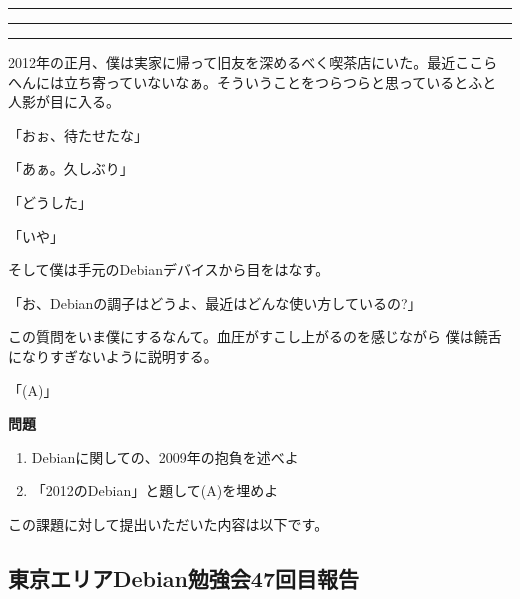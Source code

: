 \documentclass[mingoth,a4paper]{jsarticle}
\begin{document}
\newpage

\begin{minipage}[b]{0.2\hsize}
 \colorbox{titleback}{}
\end{minipage}
\begin{minipage}[b]{0.8\hsize}
\hrule
\vspace{2mm}
\hrule
%
%
\setcounter{tocdepth}{1}
\tableofcontents
\vspace{2mm}
\hrule
\end{minipage}



2012年の正月、僕は実家に帰って旧友を深めるべく喫茶店にいた。最近ここら
へんには立ち寄っていないなぁ。そういうことをつらつらと思っているとふと
人影が目に入る。

「おぉ、待たせたな」

「あぁ。久しぶり」

「どうした」

「いや」

そして僕は手元のDebianデバイスから目をはなす。

「お、Debianの調子はどうよ、最近はどんな使い方しているの?」

この質問をいま僕にするなんて。血圧がすこし上がるのを感じながら
僕は饒舌になりすぎないように説明する。

「(A)」


{\bf 問題}

\begin{enumerate}
 \item Debianに関しての、2009年の抱負を述べよ
 \item 「2012のDebian」と題して(A)を埋めよ
\end{enumerate}

この課題に対して提出いただいた内容は以下です。

\begin{multicols}{2}
 
\end{multicols}

%
%


\subsection{東京エリアDebian勉強会47回目報告}
\end{document}
